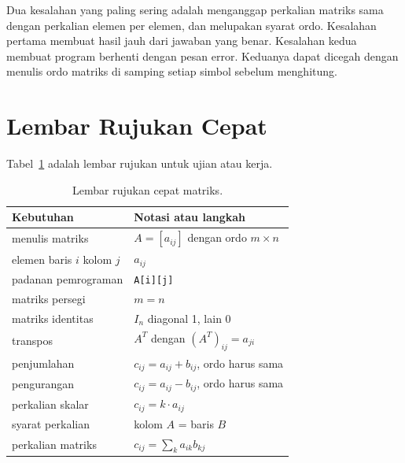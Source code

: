 \documentclass[11pt,a4paper]{article}
\begin{document}
Dua kesalahan yang paling sering adalah menganggap perkalian matriks sama dengan perkalian elemen per elemen, dan melupakan syarat ordo. Kesalahan pertama membuat hasil jauh dari jawaban yang benar. Kesalahan kedua membuat program berhenti dengan pesan error. Keduanya dapat dicegah dengan menulis ordo matriks di samping setiap simbol sebelum menghitung.

\section{Lembar Rujukan Cepat}

Tabel~\ref{tab:rujukan-cepat} adalah lembar rujukan untuk ujian atau kerja.

\begin{table}[H]
	\centering
	\caption{Lembar rujukan cepat matriks.}
	\label{tab:rujukan-cepat}
	\footnotesize
	\begin{tabularx}{\textwidth}{l X}
		\toprule
		Kebutuhan                  & Notasi atau langkah                                             \\
		\midrule
		menulis matriks            & $A=[a_{ij}]$ dengan ordo $m \times n$                           \\
		elemen baris $i$ kolom $j$ & $a_{ij}$                                                        \\
		padanan pemrograman        & \texttt{A[i][j]}                                                \\
		matriks persegi            & $m=n$                                                           \\
		matriks identitas          & $I_n$ diagonal 1, lain 0                                        \\
		transpos                   & $A^T$ dengan $(A^T)_{ij}=a_{ji}$                                \\
		penjumlahan                & $c_{ij}=a_{ij}+b_{ij}$, ordo harus sama                         \\
		pengurangan                & $c_{ij}=a_{ij}-b_{ij}$, ordo harus sama                         \\
		perkalian skalar           & $c_{ij}=k \cdot a_{ij}$                                         \\
		syarat perkalian           & kolom $A$ = baris $B$                                           \\
		perkalian matriks          & $c_{ij}=\sum_k a_{ik}b_{kj}$                                    \\

\end{tabularx}
\end{table}
\end{document}
